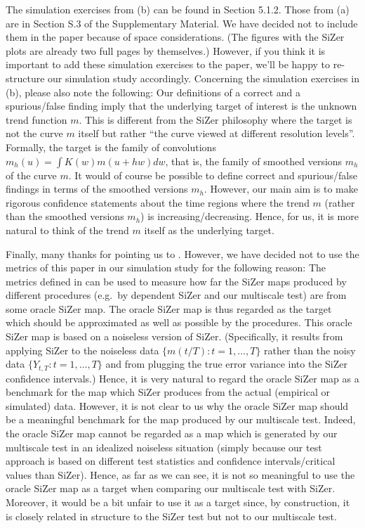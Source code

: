 \documentclass[a4paper,12pt]{article}
\begin{document}
\begin{enumerate}[label=(\arabic*),leftmargin=0.7cm]
\begin{enumerate}[label=(\alph*), leftmargin=0.7cm]
\end{enumerate}
The simulation exercises from (b) can be found in Section 5.1.2. Those from (a) are in Section S.3 of the Supplementary Material. We have decided not to include them in the paper because of space considerations. (The figures with the SiZer plots are already two full pages by themselves.) However, if you think it is important to add these simulation exercises to the paper, we'll be happy to re-structure our simulation study accordingly. \newline
%
Concerning the simulation exercises in (b), please also note the following: Our definitions of a correct and a spurious/false finding imply that the underlying target of interest is the unknown trend function $m$. This is different from the SiZer philosophy where the target is not the curve $m$ itself but rather ``the curve viewed at different resolution levels''. Formally, the target is the family of  convolutions $m_h(u) = \int K(w) m(u+hw) dw$, that is, the family of smoothed versions $m_h$ of the curve $m$. It would of course be possible to define correct and spurious/false findings in terms of the smoothed versions $m_h$. However, our main aim is to make rigorous confidence statements about the time regions where the trend $m$ (rather than the smoothed versions $m_h$) is increasing/decreasing. Hence, for us, it is more natural to think of the trend $m$ itself as the underlying target. 

Finally, many thanks for pointing us to \cite{HannigLeePark2013}. However, we have decided not to use the metrics of this paper in our simulation study for the following reason: The metrics defined in \cite{HannigLeePark2013} can be used to measure how far the SiZer maps produced by different procedures (e.g.\ by dependent SiZer and our multiscale test) are from some oracle SiZer map. The oracle SiZer map is thus regarded as the target which should be approximated as well as possible by the procedures. This oracle SiZer map is based on a noiseless version of SiZer. (Specifically, it results from applying SiZer to the noiseless data $\{ m(t/T): t=1,\ldots,T\}$ rather than the noisy data $\{ Y_{t,T}: t=1,\ldots,T\}$ and from plugging the true error variance into the SiZer confidence intervals.) Hence, it is very natural to regard the oracle SiZer map as a benchmark for the map which SiZer produces from the actual (empirical or simulated) data. 
However, it is not clear to us why the oracle SiZer map should be a meaningful benchmark for the map produced by our multiscale test. Indeed, the oracle SiZer map cannot be regarded as a map which is generated by our multiscale test in an idealized noiseless situation (simply because our test approach is based on different test statistics and confidence intervals/critical values than SiZer). Hence, as far as we can see, it is not so meaningful to use the oracle SiZer map as a target when comparing our multiscale test with SiZer. Moreover, it would be a bit unfair to use it as a target since, by construction, it is closely related in structure to the SiZer test but not to our multiscale test. 



\end{enumerate}
\end{document}
